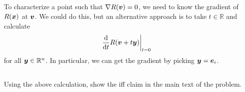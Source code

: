 \documentclass[11pt,letterpaper]{article}
\begin{document}
\subsection{}
To characterize a point such that $\nabla R(\boldsymbol{v}) = 0$, we need to know the gradient of $R(\boldsymbol{x})$ at $\boldsymbol{v}$. We could do this, but an alternative approach is to take $t\in \mathbb{R}$ and calculate
\begin{align*}
    \left.\frac{\mathrm{d}}{\mathrm{d} t} R(\boldsymbol{v}+t\boldsymbol{y})\right|_{t=0}
\end{align*}
for all $\boldsymbol{y}\in\mathbb{R}^n$. In particular, we can get the gradient by picking $\boldsymbol{y} = \boldsymbol{e}_i$.

\subsection{}
Using the above calculation, show the iff claim in the main text of the problem.

    
\printbibliography
\end{document}
